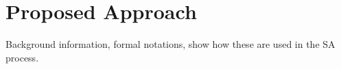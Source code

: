 \chapter{Proposed Approach}
\label{ch:prop}

Background information, formal notations, show how these are used in the SA process.







